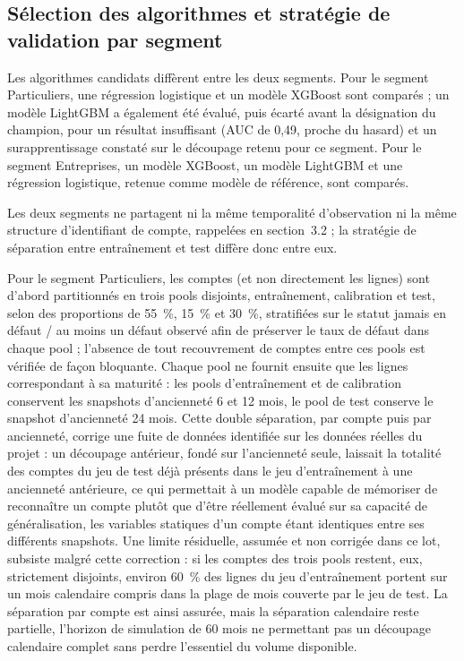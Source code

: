 \subsection{Sélection des algorithmes et stratégie de validation par segment}

Les algorithmes candidats diffèrent entre les deux segments. Pour le segment Particuliers, une régression logistique et un modèle XGBoost sont comparés ; un modèle LightGBM a également été évalué, puis écarté avant la désignation du champion, pour un résultat insuffisant (AUC de 0,49, proche du hasard) et un surapprentissage constaté sur le découpage retenu pour ce segment. Pour le segment Entreprises, un modèle XGBoost, un modèle LightGBM et une régression logistique, retenue comme modèle de référence, sont comparés.

Les deux segments ne partagent ni la même temporalité d'observation ni la même structure d'identifiant de compte, rappelées en section~3.2 ; la stratégie de séparation entre entraînement et test diffère donc entre eux.

Pour le segment Particuliers, les comptes (et non directement les lignes) sont d'abord partitionnés en trois pools disjoints, entraînement, calibration et test, selon des proportions de 55~\%, 15~\% et 30~\%, stratifiées sur le statut \og jamais en défaut / au moins un défaut observé \fg{} afin de préserver le taux de défaut dans chaque pool ; l'absence de tout recouvrement de comptes entre ces pools est vérifiée de façon bloquante. Chaque pool ne fournit ensuite que les lignes correspondant à sa maturité : les pools d'entraînement et de calibration conservent les snapshots d'ancienneté 6 et 12 mois, le pool de test conserve le snapshot d'ancienneté 24 mois. Cette double séparation, par compte puis par ancienneté, corrige une fuite de données identifiée sur les données réelles du projet : un découpage antérieur, fondé sur l'ancienneté seule, laissait la totalité des comptes du jeu de test déjà présents dans le jeu d'entraînement à une ancienneté antérieure, ce qui permettait à un modèle capable de mémoriser de reconnaître un compte plutôt que d'être réellement évalué sur sa capacité de généralisation, les variables statiques d'un compte étant identiques entre ses différents snapshots. Une limite résiduelle, assumée et non corrigée dans ce lot, subsiste malgré cette correction : si les comptes des trois pools restent, eux, strictement disjoints, environ 60~\% des lignes du jeu d'entraînement portent sur un mois calendaire compris dans la plage de mois couverte par le jeu de test. La séparation par compte est ainsi assurée, mais la séparation calendaire reste partielle, l'horizon de simulation de 60 mois ne permettant pas un découpage calendaire complet sans perdre l'essentiel du volume disponible.

